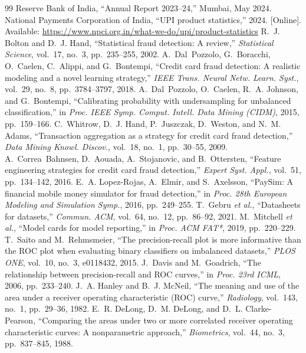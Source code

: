\documentclass[conference]{IEEEtran}
\begin{document}
\begin{thebibliography}{99}\footnotesize
{} Reserve Bank of India, ``Annual Report 2023--24,'' Mumbai, May 2024.
 National Payments Corporation of India, ``UPI product statistics,'' 2024. [Online]. Available: \url{https://www.npci.org.in/what-we-do/upi/product-statistics}
 R.~J. Bolton and D.~J. Hand, ``Statistical fraud detection: A review,'' \emph{Statistical Science}, vol.~17, no.~3, pp.~235--255, 2002.
 A.~Dal~Pozzolo, G.~Boracchi, O.~Caelen, C.~Alippi, and G.~Bontempi, ``Credit card fraud detection: A realistic modeling and a novel learning strategy,'' \emph{IEEE Trans. Neural Netw. Learn. Syst.}, vol.~29, no.~8, pp.~3784--3797, 2018.
 A.~Dal~Pozzolo, O.~Caelen, R.~A. Johnson, and G.~Bontempi, ``Calibrating probability with undersampling for unbalanced classification,'' in \emph{Proc. IEEE Symp. Comput. Intell. Data Mining (CIDM)}, 2015, pp.~159--166.
 C.~Whitrow, D.~J. Hand, P.~Juszczak, D.~Weston, and N.~M. Adams, ``Transaction aggregation as a strategy for credit card fraud detection,'' \emph{Data Mining Knowl. Discov.}, vol.~18, no.~1, pp.~30--55, 2009.
 A.~Correa~Bahnsen, D.~Aouada, A.~Stojanovic, and B.~Ottersten, ``Feature engineering strategies for credit card fraud detection,'' \emph{Expert Syst. Appl.}, vol.~51, pp.~134--142, 2016.
 E.~A. Lopez-Rojas, A.~Elmir, and S.~Axelsson, ``PaySim: A financial mobile money simulator for fraud detection,'' in \emph{Proc. 28th European Modeling and Simulation Symp.}, 2016, pp.~249--255.
 T.~Gebru \emph{et al.}, ``Datasheets for datasets,'' \emph{Commun. ACM}, vol.~64, no.~12, pp.~86--92, 2021.
 M.~Mitchell \emph{et al.}, ``Model cards for model reporting,'' in \emph{Proc. ACM FAT*}, 2019, pp.~220--229.
 T.~Saito and M.~Rehmsmeier, ``The precision-recall plot is more informative than the ROC plot when evaluating binary classifiers on imbalanced datasets,'' \emph{PLOS ONE}, vol.~10, no.~3, e0118432, 2015.
 J.~Davis and M.~Goadrich, ``The relationship between precision-recall and ROC curves,'' in \emph{Proc. 23rd ICML}, 2006, pp.~233--240.
 J.~A. Hanley and B.~J. McNeil, ``The meaning and use of the area under a receiver operating characteristic (ROC) curve,'' \emph{Radiology}, vol.~143, no.~1, pp.~29--36, 1982.
 E.~R. DeLong, D.~M. DeLong, and D.~L. Clarke-Pearson, ``Comparing the areas under two or more correlated receiver operating characteristic curves: A nonparametric approach,'' \emph{Biometrics}, vol.~44, no.~3, pp.~837--845, 1988.

\end{thebibliography}
\end{document}
